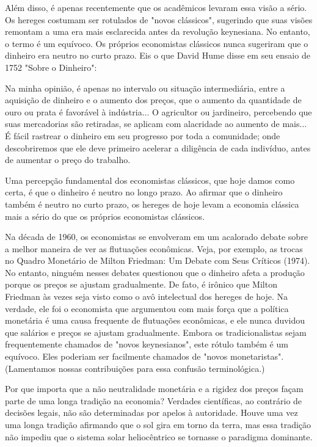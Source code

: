 \documentclass[12pt]{article}
\begin{document}
Além disso, é apenas recentemente que os acadêmicos levaram essa visão a sério. Os hereges costumam ser rotulados de "novos clássicos", sugerindo que suas visões remontam a uma era mais esclarecida antes da revolução keynesiana. No entanto, o termo é um equívoco. Os próprios economistas clássicos nunca sugeriram que o dinheiro era neutro no curto prazo. Eis o que David Hume disse em seu ensaio de 1752 "Sobre o Dinheiro":

Na minha opinião, é apenas no intervalo ou situação intermediária, entre a aquisição de dinheiro e o aumento dos preços, que o aumento da quantidade de ouro ou prata é favorável à indústria... O agricultor ou jardineiro, percebendo que suas mercadorias são retiradas, se aplicam com alacridade ao aumento de mais... É fácil rastrear o dinheiro em seu progresso por toda a comunidade; onde descobriremos que ele deve primeiro acelerar a diligência de cada indivíduo, antes de aumentar o preço do trabalho.

Uma percepção fundamental dos economistas clássicos, que hoje damos como certa, é que o dinheiro é neutro no longo prazo. Ao afirmar que o dinheiro também é neutro no curto prazo, os hereges de hoje levam a economia clássica mais a sério do que os próprios economistas clássicos.

Na década de 1960, os economistas se envolveram em um acalorado debate sobre a melhor maneira de ver as flutuações econômicas. Veja, por exemplo, as trocas no Quadro Monetário de Milton Friedman: Um Debate com Seus Críticos (1974). No entanto, ninguém nesses debates questionou que o dinheiro afeta a produção porque os preços se ajustam gradualmente. De fato, é irônico que Milton Friedman às vezes seja visto como o avô intelectual dos hereges de hoje. Na verdade, ele foi o economista que argumentou com mais força que a política monetária é uma causa frequente de flutuações econômicas, e ele nunca duvidou que salários e preços se ajustam gradualmente. Embora os tradicionalistas sejam frequentemente chamados de "novos keynesianos", este rótulo também é um equívoco. Eles poderiam ser facilmente chamados de "novos monetaristas". (Lamentamos nossas contribuições para essa confusão terminológica.)

Por que importa que a não neutralidade monetária e a rigidez dos preços façam parte de uma longa tradição na economia? Verdades científicas, ao contrário de decisões legais, não são determinadas por apelos à autoridade. Houve uma vez uma longa tradição afirmando que o sol gira em torno da terra, mas essa tradição não impediu que o sistema solar heliocêntrico se tornasse o paradigma dominante.
\end{document}
